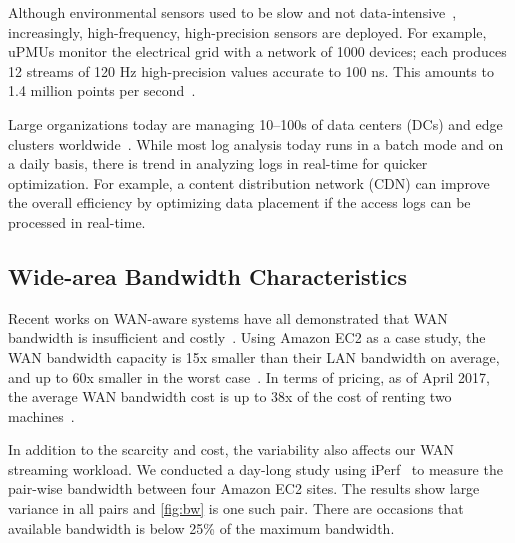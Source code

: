  Although environmental sensors used to be
slow and not data-intensive~\cite{atzori2010internet}, increasingly,
high-frequency, high-precision sensors are deployed. For example, uPMUs monitor
the electrical grid with a network of 1000 devices; each produces 12 streams of
120 Hz high-precision values accurate to 100 ns. This amounts to 1.4 million
points per second~\cite{andersen2016btrdb}.

 Large organizations today are managing
10--100s of data centers (DCs) and edge clusters
worldwide~\cite{calder2013mapping}. While most log analysis today runs in a
batch mode and on a daily basis, there is trend in analyzing logs in real-time
for quicker optimization. For example, a content distribution network (CDN) can
improve the overall efficiency by optimizing data placement if the access logs
can be processed in real-time.


\subsection{Wide-area Bandwidth Characteristics}
\label{sec:wide-area-bandwidth}

Recent works on WAN-aware systems have all demonstrated that WAN bandwidth is
insufficient and costly~\cite{pu2015low, vulimiri2015global,
  vulimiri2015wananlytics, hsieh17gaia}. Using Amazon EC2 as a case study, the
WAN bandwidth capacity is 15x smaller than their LAN bandwidth on average, and
up to 60x smaller in the worst case~\cite{hsieh17gaia}. In terms of pricing, as
of April 2017, the average WAN bandwidth cost is up to 38x of the cost of
renting two machines~\cite{amazon2017pricing}.

In addition to the scarcity and cost, the variability also affects our WAN
streaming workload. We conducted a day-long study using iPerf~\cite{iperf3} to
measure the pair-wise bandwidth between four Amazon EC2 sites. The results show
large variance in all pairs and \autoref{fig:bw} is one such pair. There are
occasions that available bandwidth is below 25\% of the maximum bandwidth.

